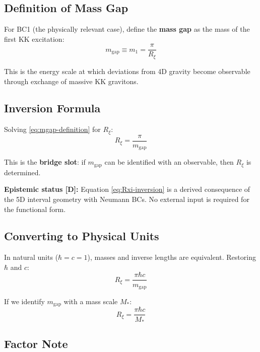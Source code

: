 \documentclass[11pt,a4paper]{article}
\newcommand{\Rxi}{R_\xi}
\newcommand{\mgap}{m_{\mathrm{gap}}}
\begin{document}
\subsection{Definition of Mass Gap}

For BC1 (the physically relevant case), define the \textbf{mass gap} as the mass
of the first KK excitation:
\begin{equation}
\mgap \equiv m_1 = \frac{\pi}{\Rxi}
\label{eq:mgap-definition}
\end{equation}

This is the energy scale at which deviations from 4D gravity become observable
through exchange of massive KK gravitons.

\subsection{Inversion Formula}

Solving \eqref{eq:mgap-definition} for $\Rxi$:
\begin{equation}
\boxed{\Rxi = \frac{\pi}{\mgap}}
\label{eq:Rxi-inversion}
\end{equation}

This is the \textbf{bridge slot}: if $\mgap$ can be identified with an observable,
then $\Rxi$ is determined.

\textbf{Epistemic status [D]:} Equation \eqref{eq:Rxi-inversion} is a derived
consequence of the 5D interval geometry with Neumann BCs. No external input is
required for the functional form.

\subsection{Converting to Physical Units}

In natural units ($\hbar = c = 1$), masses and inverse lengths are equivalent.
Restoring $\hbar$ and $c$:
\begin{equation}
\Rxi = \frac{\pi \hbar c}{\mgap}
\label{eq:Rxi-physical-units}
\end{equation}

If we identify $\mgap$ with a mass scale $M_*$:
\begin{equation}
\Rxi = \frac{\pi \hbar c}{M_*}
\label{eq:Rxi-from-Mstar}
\end{equation}

\subsection{Factor Note}
\end{document}
